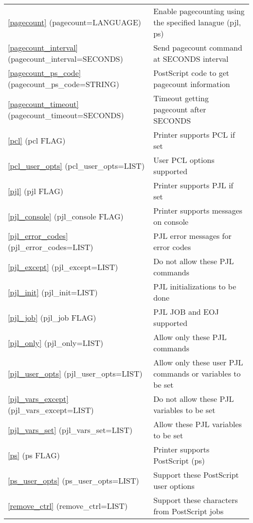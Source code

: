 \documentclass[a4paper]{article}
\begin{document}
\begin{table}[tbp]
\begin{center}
\begin{tabular}{ll}
{\ttfamily \ref{pagecount} {(pagecount=LANGUAGE)}}&  Enable pagecounting using the specified lanague (pjl, ps)\\ 
{\ttfamily \ref{pagecount_interval} {(pagecount\_interval=SECONDS)}}&  Send pagecount command at SECONDS interval\\ 
{\ttfamily \ref{pagecount_ps_code} {(pagecount\_ps\_code=STRING)}}&  PostScript code to get pagecount information\\ 
{\ttfamily \ref{pagecount_timeout} {(pagecount\_timeout=SECONDS)}}&  Timeout getting pagecount after SECONDS\\ 
{\ttfamily \ref{pcl} {(pcl FLAG)}}&  Printer supports PCL if set\\ 
{\ttfamily \ref{pcl_user_opts} {(pcl\_user\_opts=LIST)}}&  User PCL options supported\\ 
{\ttfamily \ref{pjl} {(pjl FLAG)}}&  Printer supports PJL if set\\ 
{\ttfamily \ref{pjl_console} {(pjl\_console FLAG)}}&  Printer supports messages on console\\ 
{\ttfamily \ref{pjl_error_codes} {(pjl\_error\_codes=LIST)}}&  PJL error messages for error codes\\ 
{\ttfamily \ref{pjl_except} {(pjl\_except=LIST)}}&  Do not allow these PJL commands\\ 
{\ttfamily \ref{pjl_init} {(pjl\_init=LIST)}}&  PJL initializations to be done\\ 
{\ttfamily \ref{pjl_job} {(pjl\_job FLAG)}}&  PJL JOB and EOJ supported\\ 
{\ttfamily \ref{pjl_only} {(pjl\_only=LIST)}}&  Allow only these PJL commands\\ 
{\ttfamily \ref{pjl_user_opts} {(pjl\_user\_opts=LIST)}}&  Allow only these user PJL commands or variables to be set\\ 
{\ttfamily \ref{pjl_vars_except} {(pjl\_vars\_except=LIST)}}&  Do not allow these PJL variables to be set\\ 
{\ttfamily \ref{pjl_vars_set} {(pjl\_vars\_set=LIST)}}&  Allow these PJL variables to be set\\ 
{\ttfamily \ref{ps} {(ps FLAG)}}&  Printer supports PostScript (ps)\\ 
{\ttfamily \ref{ps_user_opts} {(ps\_user\_opts=LIST)}}&  Support these PostScript user options\\ 
{\ttfamily \ref{remove_ctrl} {(remove\_ctrl=LIST)}}&  Support these characters from PostScript jobs\\ 
\end{tabular}
\end{center}
\end{table}
\end{document}
